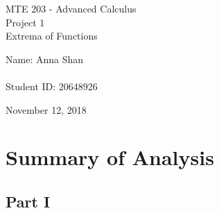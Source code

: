 \documentclass[12pt,onecolumn]{article}
\begin{document}
\begin{titlepage}
\fontsize{20pt}{20pt}\selectfont
\begin{center}
MTE 203 - Advanced Calculus\\
\vspace{4cm}
Project 1\\
\vspace{0.6cm}
Extrema of Functions\\
\end{center}
\vspace{4cm}
Name: Anna Shan\\ \\
Student ID: 20648926\\
\vspace{7cm}
\begin{center}
November 12, 2018
\end{center}

\end{titlepage}

\setcounter{page}{2}

\newpage
{}
\setcounter{page}{1}

\section{Summary of Analysis}

\subsection*{Part I}
\end{document}
